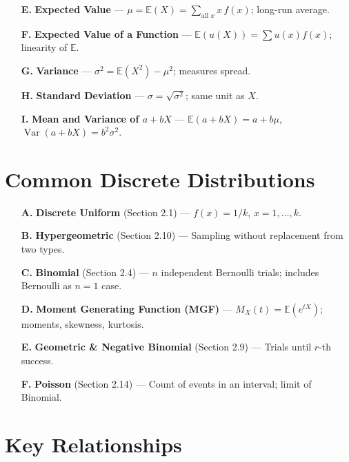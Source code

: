 \documentclass{article}
\theoremstyle{remark}
\newlength{\subsecindent}
\newenvironment{secbody}{%
  \begin{list}{}{%
    \setlength{\leftmargin}{\subsecindent}%
    \setlength{\rightmargin}{0pt}%
    \setlength{\topsep}{0pt}%
    \setlength{\partopsep}{0pt}%
    \setlength{\parsep}{\parskip}%
    \setlength{\itemsep}{\parskip}%
  }\item\relax
}{\end{list}}
\newcommand{\E}{\mathbb{E}}
\newcommand{\Var}{\operatorname{Var}}
\begin{document}
\begin{secbody}
\begin{itemize}
  \item[\textbf{E.}] \textbf{Expected Value} --- $\mu = \E(X) = \sum_{\text{all } x} x\, f(x)$; long-run average.
  \item[\textbf{F.}] \textbf{Expected Value of a Function} --- $\E(u(X)) = \sum u(x) f(x)$; linearity of $\E$.
  \item[\textbf{G.}] \textbf{Variance} --- $\sigma^2 = \E(X^2) - \mu^2$; measures spread.
  \item[\textbf{H.}] \textbf{Standard Deviation} --- $\sigma = \sqrt{\sigma^2}$; same unit as $X$.
  \item[\textbf{I.}] \textbf{Mean and Variance of $a + bX$} --- $\E(a+bX) = a + b\mu$, $\Var(a+bX) = b^2 \sigma^2$.
\end{itemize}
\end{secbody}

\section{Common Discrete Distributions}

\begin{secbody}
\begin{itemize}
  \item[\textbf{A.}] \textbf{Discrete Uniform} (Section 2.1) --- $f(x) = 1/k$, $x = 1, \ldots, k$.
  \item[\textbf{B.}] \textbf{Hypergeometric} (Section 2.10) --- Sampling without replacement from two types.
  \item[\textbf{C.}] \textbf{Binomial} (Section 2.4) --- $n$ independent Bernoulli trials; includes Bernoulli as $n=1$ case.
  \item[\textbf{D.}] \textbf{Moment Generating Function (MGF)} --- $M_X(t) = \E(e^{tX})$; moments, skewness, kurtosis.
  \item[\textbf{E.}] \textbf{Geometric \& Negative Binomial} (Section 2.9) --- Trials until $r$-th success.
  \item[\textbf{F.}] \textbf{Poisson} (Section 2.14) --- Count of events in an interval; limit of Binomial.
\end{itemize}
\end{secbody}

\section{Key Relationships}
\end{document}
